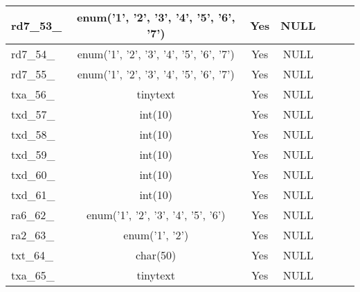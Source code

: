 \begin{longtable}{|l|c|c|c|l|l|l|}
rd7\_53\_ & enum('1', '2', '3', '4', '5', '6', '7') & Yes & NULL &  &  &  \\ \hline 
rd7\_54\_ & enum('1', '2', '3', '4', '5', '6', '7') & Yes & NULL &  &  &  \\ \hline 
rd7\_55\_ & enum('1', '2', '3', '4', '5', '6', '7') & Yes & NULL &  &  &  \\ \hline 
txa\_56\_ & tinytext & Yes & NULL &  &  &  \\ \hline 
txd\_57\_ & int(10) & Yes & NULL &  &  &  \\ \hline 
txd\_58\_ & int(10) & Yes & NULL &  &  &  \\ \hline 
txd\_59\_ & int(10) & Yes & NULL &  &  &  \\ \hline 
txd\_60\_ & int(10) & Yes & NULL &  &  &  \\ \hline 
txd\_61\_ & int(10) & Yes & NULL &  &  &  \\ \hline 
ra6\_62\_ & enum('1', '2', '3', '4', '5', '6') & Yes & NULL &  &  &  \\ \hline 
ra2\_63\_ & enum('1', '2') & Yes & NULL &  &  &  \\ \hline 
txt\_64\_ & char(50) & Yes & NULL &  &  &  \\ \hline 
txa\_65\_ & tinytext & Yes & NULL &  &  &  \\ \hline 
 \end{longtable}

